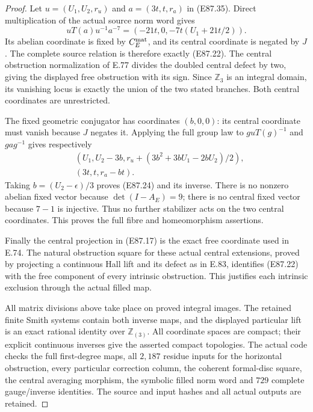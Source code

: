 \begin{proof}
Let $u=(U_1,U_2,r_u)$ and
$a=(3t,t,r_a)$ in (E87.35).
Direct multiplication of the actual
source norm word gives
\[
 uT(a)u^{-1}a^{-7}
       =(-21t,0,-7t(U_1+21t/2)).
 \tag{E87.38}
\]
Its abelian coordinate is fixed by
$C_E^{\rm mat}$, and its central
coordinate is negated by $J$.
The complete source relation is
therefore exactly (E87.22). The
central obstruction normalization
of E.77 divides the doubled central
defect by two, giving the displayed
free obstruction with its sign.
Since $\mathbb Z_3$ is an integral
domain, its vanishing locus is
exactly the union of the two
stated branches. Both central
coordinates are unrestricted.

The fixed geometric conjugator
has coordinates $(b,0,0)$: its
central coordinate must vanish
because $J$ negates it. Applying
the full group law to
$g u T(g)^{-1}$ and $gag^{-1}$
gives respectively
\[
 \begin{aligned}
 &(U_1,U_2-3b,
       r_u+(3b^2+3bU_1-2bU_2)/2),\\
 &(3t,t,r_a-bt).
 \end{aligned}
 \tag{E87.39}
\]
Taking $b=(U_2-\epsilon)/3$
proves (E87.24) and its inverse.
There is no nonzero abelian fixed
vector because $\det(I-A_E)=9$;
there is no central fixed vector
because $7-1$ is injective.
Thus no further stabilizer acts
on the two central coordinates.
This proves the full fibre and
homeomorphism assertions.

Finally the central projection
in (E87.17) is the exact free
coordinate used in E.74. The
natural obstruction square for
these actual central extensions,
proved by projecting a continuous
Hall lift and its defect as in
E.83, identifies (E87.22) with
the free component of every
intrinsic obstruction. This
justifies each intrinsic exclusion
through the actual filled map.

All matrix divisions above take
place on proved integral images.
The retained finite Smith systems
contain both inverse maps, and
the displayed particular lift
is an exact rational identity
over $\mathbb Z_{(3)}$. All
coordinate spaces are compact;
their explicit continuous inverses
give the asserted compact
topologies. The actual code checks
the full first-degree maps, all
$2,187$ residue inputs for the
horizontal obstruction, every
particular correction column,
the coherent formal-disc square,
the central averaging morphism,
the symbolic filled norm word
and $729$ complete gauge/inverse
identities. The source and input
hashes and all actual outputs
are retained.
\end{proof}

